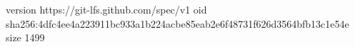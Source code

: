 version https://git-lfs.github.com/spec/v1
oid sha256:4dfc4ee4a223911bc933a1b224acbe85eab2e6f48731f626d3564bfb13c1e54e
size 1499
